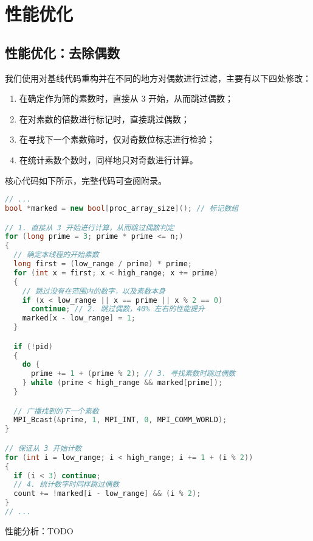 \documentclass[11pt]{article}
\begin{document}
  \section{性能优化}
  \subsection{性能优化：去除偶数}
  我们使用对基线代码重构并在不同的地方对偶数进行过滤，主要有以下四处修改：
  \begin{enumerate}[itemindent=1em]
    \item 在确定作为筛的素数时，直接从 3 开始，从而跳过偶数；
    \item 在对素数的倍数进行标记时，直接跳过偶数；
    \item 在寻找下一个素数筛时，仅对奇数位标志进行检验；
    \item 在统计素数个数时，同样地只对奇数进行计算。
  \end{enumerate}

  核心代码如下所示，完整代码可查阅附录。

  \begin{file}
    \begin{lstlisting}[language=C++]
// ...
bool *marked = new bool[proc_array_size](); // 标记数组

// 1. 直接从 3 开始进行计算，从而跳过偶数判定
for (long prime = 3; prime * prime <= n;)
{
  // 确定本线程的开始素数
  long first = (low_range / prime) * prime;
  for (int x = first; x < high_range; x += prime)
  {
    // 跳过没有在范围内的数字，以及素数本身
    if (x < low_range || x == prime || x % 2 == 0)
      continue; // 2. 跳过偶数，40% 左右的性能提升
    marked[x - low_range] = 1;
  }

  if (!pid)
  {
    do {
      prime += 1 + (prime % 2); // 3. 寻找素数时跳过偶数
    } while (prime < high_range && marked[prime]);
  }

  // 广播找到的下一个素数
  MPI_Bcast(&prime, 1, MPI_INT, 0, MPI_COMM_WORLD);
}

// 保证从 3 开始计数
for (int i = low_range; i < high_range; i += 1 + (i % 2))
{
  if (i < 3) continue;
  // 4. 统计数字时同样跳过偶数
  count += !marked[i - low_range] && (i % 2);
}
// ...
    \end{lstlisting}
  \end{file}
  性能分析：TODO
\end{document}
